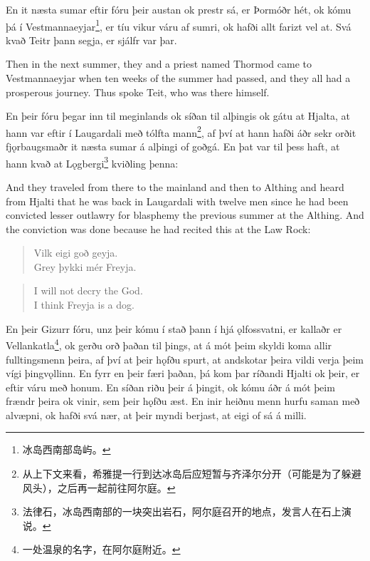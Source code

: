 \begin{paracol}{2}
    En it næsta sumar eftir fóru þeir austan ok prestr sá, er Þormóðr hét, ok kómu þá í Vestmannaeyjar\footnote{冰岛西南部岛屿。}, er tíu vikur váru af sumri, ok hafði allt farizt vel at. Svá kvað Teitr þann segja, er sjálfr var þar.
    \switchcolumn

    Then in the next summer, they and a priest named Thormod came to Vestmannaeyjar when ten weeks of the summer had passed, and they all had a prosperous journey. Thus spoke Teit, who was there himself.

    \switchcolumn*
    En þeir fóru þegar inn til meginlands ok síðan til alþingis ok gátu at Hjalta, at hann var eftir í Laugardali með tólfta mann\footnote{从上下文来看，希雅提一行到达冰岛后应短暂与齐泽尔分开（可能是为了躲避风头），之后再一起前往阿尔庭。}, af því at hann hafði áðr sekr orðit fjǫrbaugsmaðr it næsta sumar á alþingi of goðgá. En þat var til þess haft, at hann kvað at Lǫgbergi\footnote{法律石，冰岛西南部的一块突出岩石，阿尔庭召开的地点，发言人在石上演说。} kviðling þenna:
    \switchcolumn

    And they traveled from there to the mainland and then to Althing and heard from Hjalti that he was back in Laugardali with twelve men since he had been convicted lesser outlawry for blasphemy the previous summer at the Althing. And the conviction was done because he had recited this at the Law Rock:

    \switchcolumn*

    \begin{quote}
        Vilk eigi goð geyja. \\
        Grey þykki mér Freyja.
    \end{quote}

    \switchcolumn

    \begin{quote}
        I will not decry the God. \\
        I think Freyja is a dog.
    \end{quote}

    \switchcolumn*

    En þeir Gizurr fóru, unz þeir kómu í stað þann í hjá ǫlfossvatni, er kallaðr er Vellankatla\footnote{一处温泉的名字，在阿尔庭附近。}, ok gerðu orð þaðan til þings, at á mót þeim skyldi koma allir fulltingsmenn þeira, af því at þeir hǫfðu spurt, at andskotar þeira vildi verja þeim vígi þingvǫllinn. En fyrr en þeir færi þaðan, þá kom þar ríðandi Hjalti ok þeir, er eftir váru með honum. En síðan riðu þeir á þingit, ok kómu áðr á mót þeim frændr þeira ok vinir, sem þeir hǫfðu æst. En inir heiðnu menn hurfu saman með alvæpni, ok hafði svá nær, at þeir myndi berjast, at eigi of sá á milli.


\end{paracol}
